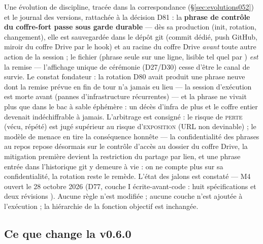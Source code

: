 Une évolution de discipline, tracée dans la correspondance (§\ref{sec:evolutions052}) et
le journal des versions, rattachée à la décision D81 : la \textbf{phrase de contrôle du
coffre-fort passe sous garde durable} — dès sa production (init, rotation,
changement), elle est sauvegardée dans le dépôt git (commit dédié, push GitHub, miroir
du coffre Drive par le hook) et au racine du coffre Drive \emph{avant} toute autre action
de la session ; le fichier  (phrase seule sur une
ligne, lisible tel quel par ) \emph{est} la remise — l’affichage
unique de cérémonie (D27/D30) cesse d’être le canal de survie. Le constat fondateur : la
rotation D80 avait produit une phrase neuve dont la remise prévue en fin de tour n’a
jamais eu lieu — la session d’exécution est morte avant (pannes d’infrastructure
récurrentes) — et la phrase ne vivait plus que dans le bac à sable éphémère : un décès
d’infra de plus et le coffre entier devenait indéchiffrable à jamais. L’arbitrage est
consigné : le risque de \textsc{perte} (vécu, répété) est jugé supérieur au risque
d’\textsc{exposition} (URL non devinable) ; le modèle de menace en tire la conséquence
honnête — la confidentialité des phrases au repos repose désormais sur le contrôle
d’accès au dossier du coffre Drive, la mitigation première devient la restriction du
partage par lien, et une phrase entrée dans l’historique git y demeure à vie : on ne
compte plus sur sa confidentialité, la rotation reste le remède. L’état des jalons est
constaté — M4 ouvert le 28 octobre 2026 (D77, couche I écrite-avant-code : huit
spécifications  et deux révisions ). Aucune règle n’est modifiée ;
aucune couche n’est ajoutée à l’exécution ; la hiérarchie de la fonction objectif est
inchangée.

\subsection{Ce que change la v0.6.0}\label{sec:nouveautes060}

